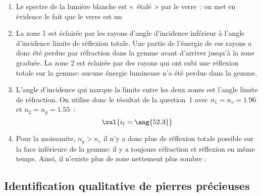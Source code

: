\documentclass[a4paper, 10pt, garamond, oneside]{book}
\begin{document}
{\begin{enumerate}
		      \begin{figure}[htbp!]
			      \centering
			      \texttt{[image: refraction\_limite]}
			      \label{fig:reflim}
		      \end{figure}
		\item Le spectre de la lumière blanche est «~étalé~» par le verre~: on met
		      en évidence le fait que le verre est un 
		\item La zone 1 est éclairée par les rayons d'angle d'incidence inférieur à
		      l'angle d'incidence limite de réflexion totale. Une partie de
		      l'énergie de ces rayons a donc été perdue par réfraction dans la gemme
		      avant d'arriver jusqu'à la zone graduée. La zone 2 est éclairée par
		      des rayons qui ont subi une réflexion totale sur la gemme: aucune
		      énergie lumineuse n'a été perdue dans la gemme.
		      \smallbreak
		\item L'angle d'incidence qui marque la limite entre les deux zones est
		      l'angle limite de réfraction. On utilise donc le résultat de la
		      question~1 avec $n_1=n_v=\num{1.96}$ et $n_2=n_g=\num{1.55}$~:
		      \[
			      \xul{i_\ell=\ang{52.3}}
		      \]
		\item Pour la moissanite, $n_g>n_v$ il n'y a donc plus de réflexion totale
		      possible sur la face inférieure de la gemme: il y a toujours
		      réfraction et réflexion en même temps. Ainsi, il n'existe plus de zone
		      nettement plus sombre : 
	\end{enumerate}
}

\subsection{Identification qualitative de pierres précieuses}


\end{document}
